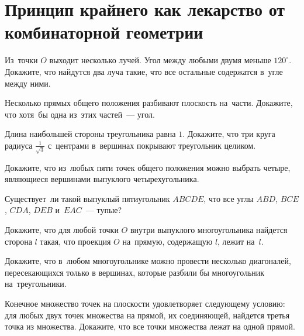
\section*{Принцип крайнего как лекарство от комбинаторной геометрии}

\begin{problems}

\item
Из~точки $O$ выходит несколько лучей.
Угол между любыми двумя меньше $120^{\circ}$.
Докажите, что найдутся два луча такие, что все остальные содержатся в~угле
между ними.

\item
Несколько прямых общего положения разбивают плоскость на~части.
Докажите, что хотя~бы одна из~этих частей~--- угол.

\item
Длина наибольшей стороны треугольника равна $1$.
Докажите, что три круга радиуса $\frac{1}{\sqrt{3}}$ с~центрами в~вершинах
покрывают треугольник целиком.

\item
Докажите, что из~любых пяти точек общего положения можно выбрать четыре,
являющиеся вершинами выпуклого четырехугольника.

\item
Существует~ли такой выпуклый пятиугольник $ABCDE$, что все углы
$ABD$, $BCE$, $CDA$, $DEB$ и~$EAC$~--- тупые?

\item
Докажите, что для любой точки $O$ внутри выпуклого многоугольника найдется
сторона $l$ такая, что проекция $O$ на~прямую, содержащую $l$, лежит на~$l$.

\item
Докажите, что в~любом многоугольнике можно провести несколько диагоналей,
пересекающихся только в вершинах, которые разбили бы многоугольник
на~треугольники.

\item
Конечное множество точек на плоскости удовлетворяет следующему условию:
для любых двух точек множества на прямой, их соединяющей, найдется третья точка
из множества.
Докажите, что все точки множества лежат на одной прямой.

\end{problems}

\iffalse %

\item
Вершины выпуклого $n$-угольника ($n > 4$) расположены в~узлах сетки.
Докажите, что внутри многоугольника есть хотя~бы одна целая точка.

\item
Фигура $S$ на~плоскости имеет площадь больше $1$.
Докажите, что найдутся такие точки $A, B \in S$, что вектор $\overline{AB}$
имеет целочисленные координаты.

\item
Внутри выпуклого стоугольника отмечено $k$ точек ($2 \leq k \leq 50$).
Докажите, что можно выбрать $2k$ вершин стоугольника так, что $2k$-угольник
с~вершинами них содержит все отмеченные точки.

\fi %

